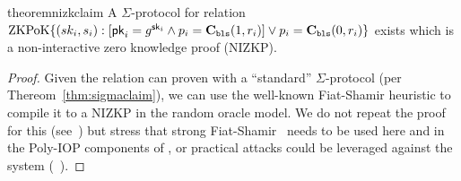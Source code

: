 
\begin{restatable}{theorem}{nizkclaim}
\label{thm:nizkclaim}
A $\Sigma$-protocol for relation $\mathrm{ZKPoK} \{ (sk_i,s_i) :  [\mathsf{pk}_i=g^{\mathsf{sk}_i} \land p_i=\textbf{C}_\texttt{bls}(1,r_i)  ] \lor p_i=\textbf{C}_\texttt{bls}(0,r_i) \}$ exists which is a non-interactive zero knowledge proof (NIZKP).
\end{restatable}

\begin{proof}
Given the relation can proven with a ``standard'' $\Sigma$-protocol (per Thereom~\ref{thm:sigmaclaim}), we can use the well-known Fiat-Shamir heuristic to compile it to a NIZKP in the random oracle model. We do not repeat the proof for this (see~\cite{damgard10,sigma}) but stress that strong Fiat-Shamir~\cite{weakfs} needs to be used here and in the Poly-IOP components of \Sys, or practical attacks could be leveraged against the system (\cf~\cite{weakfsattacks}).\end{proof}

